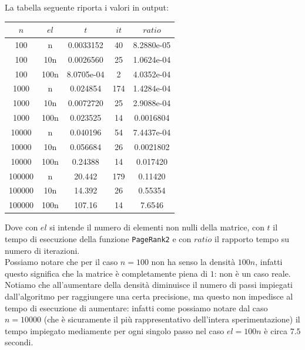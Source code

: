 \documentclass{article}
\begin{document}
	La tabella seguente riporta i valori in output:
	
	\begin{center}
		\begin{tabular}{c|c|c|c|c}
			$n$ & $el$ & $t$ & $it$ & $ratio$   \\ \hline
			100 & n & 0.0033152 & 40 & 8.2880e-05 \\
			100 & 10n & 0.0026560 & 25 & 1.0624e-04 \\
			100 & 100n & 8.0705e-04 & 2 & 4.0352e-04 \\
			1000 & n & 0.024854 & 174 & 1.4284e-04 \\
			1000 & 10n & 0.0072720 & 25 & 2.9088e-04 \\
			1000 & 100n & 0.023525 & 14 & 0.0016804 \\
			10000 & n & 0.040196 & 54 & 7.4437e-04 \\
			10000 & 10n & 0.056684& 26 & 0.0021802 \\
			10000 & 100n & 0.24388 & 14 & 0.017420 \\
			100000 & n & 20.442 & 179 & 0.11420 \\
			100000 & 10n & 14.392 & 26 & 0.55354 \\
			100000 & 100n & 107.16 & 14 & 7.6546 \\
		\end{tabular}
	\end{center}
	Dove con $el$ si intende il numero di elementi non nulli della matrice, con $t$ il tempo di esecuzione della funzione {\tt PageRank2} e con $ratio$ il rapporto tempo su numero di iterazioni.\\
	Possiamo notare che per il caso $n=100$ non ha senso la densità $100n$, infatti questo significa che la matrice è completamente piena di $1$: non è un caso reale.\\
	Notiamo che all'aumentare della densità diminuisce il numero di passi impiegati dall'algoritmo per raggiungere una certa precisione, ma questo non impedisce al tempo di esecuzione di aumentare: infatti come possiamo notare dal caso $n=10000$ (che è sicuramente il più rappresentativo dell'intera sperimentazione) il tempo impiegato mediamente per ogni singolo passo nel caso $el=100n$ è circa $7.5$ secondi.

	
\end{document}
